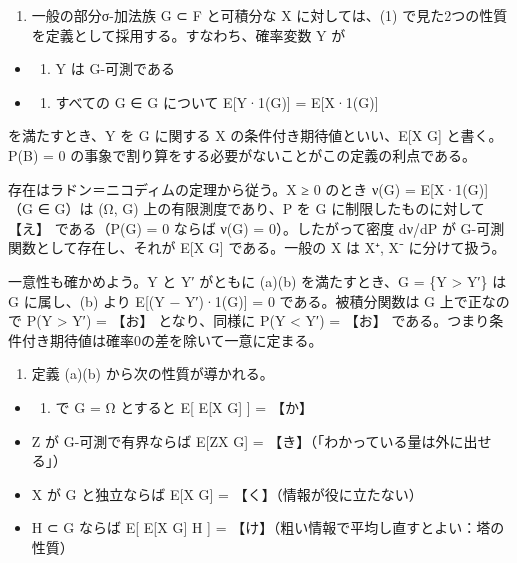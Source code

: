 \documentclass[
  10pt,
  a4paper,
]{article}
\providecommand{\tightlist}{%
  \setlength{\itemsep}{0pt}\setlength{\parskip}{0pt}}
\begin{document}
\begin{enumerate}
\def\labelenumi{(\arabic{enumi})}
\setcounter{enumi}{1}
\tightlist
\item
  一般の部分σ-加法族 G ⊂ F と可積分な X に対しては、(1)
  で見た2つの性質を定義として採用する。すなわち、確率変数 Y が
\end{enumerate}

\begin{itemize}
\item
  \begin{enumerate}
  \def\labelenumi{(\alph{enumi})}
  \tightlist
  \item
    Y は G-可測である
  \end{enumerate}
\item
  \begin{enumerate}
  \def\labelenumi{(\alph{enumi})}
  \setcounter{enumi}{1}
  \tightlist
  \item
    すべての G ∈ G について E{[}Y·1(G){]} = E{[}X·1(G){]}
  \end{enumerate}
\end{itemize}

を満たすとき、Y を G に関する X の条件付き期待値といい、E{[}X \textbar{}
G{]} と書く。P(B) = 0
の事象で割り算をする必要がないことがこの定義の利点である。

存在はラドン＝ニコディムの定理から従う。X ≥ 0 のとき ν(G) =
E{[}X·1(G){]}（G ∈ G）は (Ω, G) 上の有限測度であり、P を G
に制限したものに対して 【え】 である（P(G) = 0 ならば ν(G) =
0）。したがって密度 dν/dP が G-可測関数として存在し、それが E{[}X
\textbar{} G{]} である。一般の X は X{\fallbackfont ⁺},
X{\fallbackfont ⁻} に分けて扱う。

一意性も確かめよう。Y と Y′ がともに (a)(b) を満たすとき、G = \{Y
\textgreater{} Y′\} は G に属し、(b) より E{[}(Y − Y′)·1(G){]} = 0
である。被積分関数は G 上で正なので P(Y \textgreater{} Y′) = 【お】
となり、同様に P(Y \textless{} Y′) = 【お】
である。つまり条件付き期待値は確率0の差を除いて一意に定まる。

\begin{enumerate}
\def\labelenumi{(\arabic{enumi})}
\setcounter{enumi}{2}
\tightlist
\item
  定義 (a)(b) から次の性質が導かれる。
\end{enumerate}

\begin{itemize}
\item
  \begin{enumerate}
  \def\labelenumi{(\alph{enumi})}
  \setcounter{enumi}{1}
  \tightlist
  \item
    で G = Ω とすると E{[} E{[}X \textbar{} G{]} {]} = 【か】
  \end{enumerate}
\item
  Z が G-可測で有界ならば E{[}ZX \textbar{} G{]} =
  【き】（「わかっている量は外に出せる」）
\item
  X が G と独立ならば E{[}X \textbar{} G{]} =
  【く】（情報が役に立たない）
\item
  H ⊂ G ならば E{[} E{[}X \textbar{} G{]} \textbar{} H {]} =
  【け】（粗い情報で平均し直すとよい：塔の性質）
\end{itemize}
\end{document}
